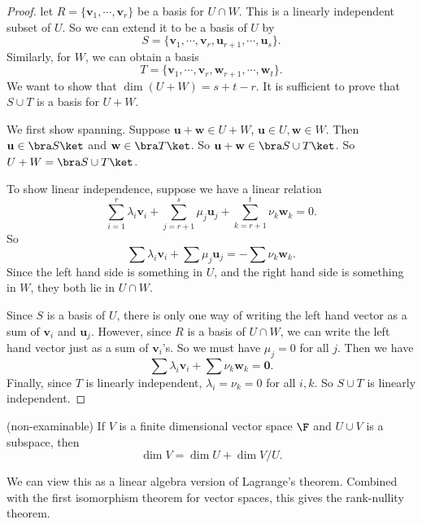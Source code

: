 \documentclass[a4paper]{article}
\begin{document}
\begin{proof}
  let $R = \{\mathbf{v}_1, \cdots, \mathbf{v}_r\}$ be a basis for $U\cap W$. This is a linearly independent subset of $U$. So we can extend it to be a basis of $U$ by
  \[
    S = \{\mathbf{v}_1, \cdots, \mathbf{v}_r, \mathbf{u}_{r + 1}, \cdots, \mathbf{u}_s\}.
  \]
  Similarly, for $W$, we can obtain a basis
  \[
    T = \{\mathbf{v}_1, \cdots, \mathbf{v}_r, \mathbf{w}_{r + 1}, \cdots, \mathbf{w}_t\}.
  \]
  We want to show that $\dim (U + W) = s + t - r$. It is sufficient to prove that $S\cup T$ is a basis for $U + W$.

  We first show spanning. Suppose $\mathbf{u} + \mathbf{w} \in U + W$, $\mathbf{u}\in U, \mathbf{w}\in W$. Then $\mathbf{u}\in \bra S\ket$ and $\mathbf{w}\in \bra T\ket$. So $\mathbf{u} + \mathbf{w} \in \bra S\cup T\ket$. So $U + W = \bra S \cup T\ket$.

  To show linear independence, suppose we have a linear relation
  \[
    \sum_{i = 1}^r \lambda_i \mathbf{v}_i + \sum_{j = r + 1}^s \mu_j \mathbf{u}_j + \sum_{k = r + 1}^t \nu_k \mathbf{w}_k = 0.
  \]
  So
  \[
    \sum \lambda_i \mathbf{v}_i + \sum \mu_j \mathbf{u}_j = - \sum \nu_k \mathbf{w}_k.
  \]
  Since the left hand side is something in $U$, and the right hand side is something in $W$, they both lie in $U\cap W$.

  Since $S$ is a basis of $U$, there is only one way of writing the left hand vector as a sum of $\mathbf{v}_i$ and $\mathbf{u}_j$. However, since $R$ is a basis of $U\cap W$, we can write the left hand vector just as a sum of $\mathbf{v}_i$'s. So we must have $\mu_j = 0$ for all $j$. Then we have
  \[
    \sum \lambda_i \mathbf{v}_i + \sum \nu_k \mathbf{w}_k = \mathbf{0}.
  \]
  Finally, since $T$ is linearly independent, $\lambda_i = \nu_k = 0$ for all $i, k$. So $S\cup T$ is linearly independent.
\end{proof}

\begin{prop}(non-examinable)
  If $V$ is a finite dimensional vector space $\F$ and $U\cup V$ is a subspace, then
  \[
    \dim V = \dim U + \dim V/U.
  \]
\end{prop}
We can view this as a linear algebra version of Lagrange's theorem. Combined with the first isomorphism theorem for vector spaces, this gives the rank-nullity theorem.
\end{document}
